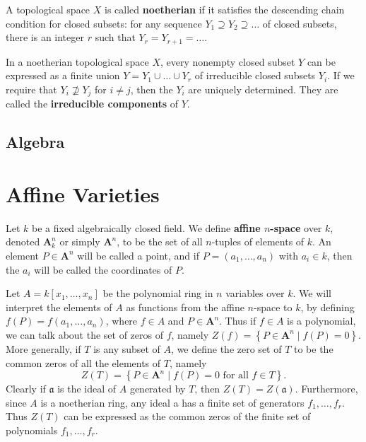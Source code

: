 \documentclass[12pt, oneside]{book}
\begin{document}
\begin{definition}
    A topological space $X$ is called \textbf{noetherian} if it satisfies the descending chain condition for closed subsets: for any sequence $Y_1 \supseteq Y_2 \supseteq \ldots$ of closed subsets, there is an integer $r$ such that $Y_r=Y_{r+1}=\ldots$.
\end{definition}

\begin{proposition}
    In a noetherian topological space $X$, every nonempty closed subset $Y$ can be expressed as a finite union $Y=Y_1 \cup \ldots \cup Y_r$ of irreducible closed subsets $Y_i$. If we require that $Y_i \nsupseteq Y_j$ for $i \neq j$, then the $Y_i$ are uniquely determined. They are called the \textbf{irreducible components} of $Y$.
\end{proposition}

\subsection{Algebra}



\section{Affine Varieties} %
Let $k$ be a fixed algebraically closed field. We define \textbf{affine $n$-space} over $k$, denoted $\mathbf{A}_k^n$ or simply $\mathbf{A}^n$, to be the set of all $n$-tuples of elements of $k$. An element $P \in \mathbf{A}^n$ will be called a point, and if $P=\left(a_1, \ldots, a_n\right)$ with $a_i \in k$, then the $a_i$ will be called the coordinates of $P$.

Let $A=k\left[x_1, \ldots, x_n\right]$ be the polynomial ring in $n$ variables over $k$. We will interpret the elements of $A$ as functions from the affine $n$-space to $k$, by defining $f(P)=f\left(a_1, \ldots, a_n\right)$, where $f \in A$ and $P \in \mathbf{A}^n$. Thus if $f \in A$ is a polynomial, we can talk about the set of zeros of $f$, namely $Z(f)=\left\{P \in \mathbf{A}^n \mid f(P)=0\right\}$. More generally, if $T$ is any subset of $A$, we define the zero set of $T$ to be the common zeros of all the elements of $T$, namely
\begin{equation*}
    Z(T)=\left\{P \in \mathbf{A}^n \mid f(P)=0 \text { for all } f \in T\right\} .
\end{equation*}
Clearly if $\mathfrak{a}$ is the ideal of $A$ generated by $T$, then $Z(T)=Z(\mathfrak{a})$. Furthermore, since $A$ is a noetherian ring, any ideal a has a finite set of generators $f_1, \ldots, f_r$. Thus $Z(T)$ can be expressed as the common zeros of the finite set of polynomials $f_1, \ldots, f_r$.
\end{document}
